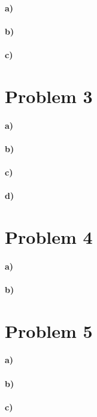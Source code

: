 \documentclass[12pt]{article}
\begin{document}
\paragraph{a)}



\paragraph{b)}

\paragraph{c)}

\section*{Problem 3}

\paragraph{a)}

\paragraph{b)}

\paragraph{c)}

\paragraph{d)}

\section*{Problem 4}

\paragraph{a)}

\paragraph{b)}

\section*{Problem 5}

\paragraph{a)}

\paragraph{b)}

\paragraph{c)}
\end{document}
